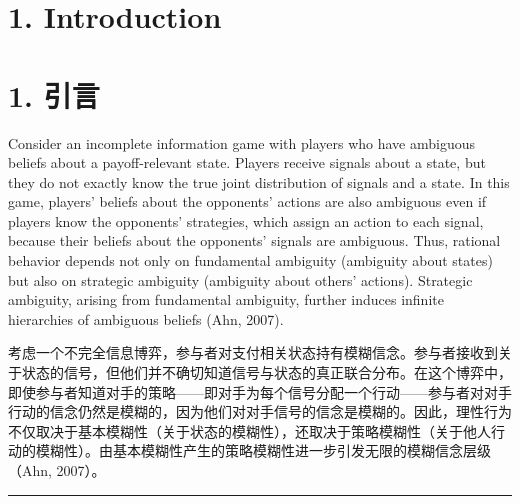 \documentclass[12pt,a4paper]{article}
\newenvironment{original}
  {\par\medskip\noindent\color{black}\ignorespaces}
  {\par\medskip}
\newenvironment{translation}
  {\par\noindent\color{darkblue}\ignorespaces}
  {\par\medskip\noindent\hrule\par\medskip}
\theoremstyle{definition}
\theoremstyle{remark}
\begin{document}
\section{1. Introduction}
\section*{\color{darkblue}1. 引言}

\begin{original}
Consider an incomplete information game with players who have ambiguous beliefs about a payoff-relevant state. Players receive signals about a state, but they do not exactly know the true joint distribution of signals and a state. In this game, players' beliefs about the opponents' actions are also ambiguous even if players know the opponents' strategies, which assign an action to each signal, because their beliefs about the opponents' signals are ambiguous. Thus, rational behavior depends not only on fundamental ambiguity (ambiguity about states) but also on strategic ambiguity (ambiguity about others' actions). Strategic ambiguity, arising from fundamental ambiguity, further induces infinite hierarchies of ambiguous beliefs (Ahn, 2007).
\end{original}
\begin{translation}
考虑一个不完全信息博弈，参与者对支付相关状态持有模糊信念。参与者接收到关于状态的信号，但他们并不确切知道信号与状态的真正联合分布。在这个博弈中，即使参与者知道对手的策略——即对手为每个信号分配一个行动——参与者对对手行动的信念仍然是模糊的，因为他们对对手信号的信念是模糊的。因此，理性行为不仅取决于基本模糊性（关于状态的模糊性），还取决于策略模糊性（关于他人行动的模糊性）。由基本模糊性产生的策略模糊性进一步引发无限的模糊信念层级（Ahn, 2007）。
\end{translation}
\end{document}
